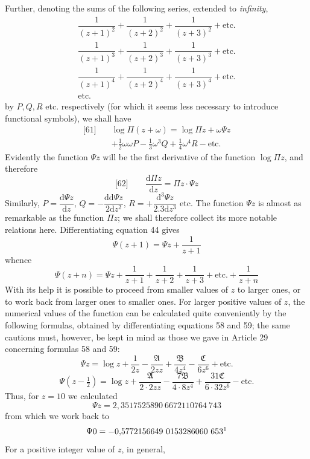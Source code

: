 Further, denoting the sums of the following series, extended to \textit{infinity},
\[
\begin{array}{l}
\dfrac{1}{(z+1)^2}+\dfrac{1}{(z+2)^2}+\dfrac{1}{(z+3)^2}+\text{etc.}\\[10pt]
\dfrac{1}{(z+1)^3}+\dfrac{1}{(z+2)^3}+\dfrac{1}{(z+3)^3}+\text{etc.}\\[10pt]
\dfrac{1}{(z+1)^4}+\dfrac{1}{(z+2)^4}+\dfrac{1}{(z+3)^4}+\text{etc.}\\[10pt]
\text{etc.}
\end{array}
\]
by $P,Q,R$ etc. respectively (for which it seems less necessary to introduce functional symbols), we shall have
\[
\begin{aligned}
{}\text{[61]}\quad&\log\Pi(z+\omega)=\log\Pi z+\omega\Psi z\\[4pt]
&+\tfrac12\omega\omega P-\tfrac13\omega^3Q+\tfrac14\omega^4R-\text{etc.}
\end{aligned}
\]
Evidently the function $\Psi z$ will be the first derivative of the function $\log\Pi z$, and therefore
\[
{}\text{[62]}\qquad \frac{\mathrm{d}\Pi z}{\mathrm{d}z}=\Pi z\cdot\Psi z
\]
Similarly, $P=\dfrac{\mathrm{d}\Psi z}{\mathrm{d}z}$, $Q=-\dfrac{\mathrm{dd}\Psi z}{2\mathrm{d}z^2}$, $R=+\dfrac{\mathrm{d}^3\Psi z}{2.3\mathrm{d}z^3}$ etc.
The function $\Psi z$ is almost as remarkable as the function $\Pi z$; we shall therefore collect its more notable relations here. Differentiating equation 44 gives
\[
\Psi(z+1)=\Psi z+\frac{1}{z+1}\tag*{[63]}
\]
whence
\[
\Psi(z+n)=\Psi z+\frac{1}{z+1}+\frac{1}{z+2}+\frac{1}{z+3}+\text{etc.}+\frac{1}{z+n}\tag*{[64]}
\]
With its help it is possible to proceed from smaller values of $z$ to larger ones, or to work back from larger ones to smaller ones. For larger positive values of $z$, the numerical values of the function can be calculated quite conveniently by the following formulas, obtained by differentiating equations 58 and 59; the same cautions must, however, be kept in mind as those we gave in Article 29 concerning formulas 58 and 59:
\[
\Psi z=\log z+\frac{1}{2z}-\frac{\mathfrak{A}}{2zz}+\frac{\mathfrak{B}}{4z^4}-\frac{\mathfrak{C}}{6z^6}+\text{etc.}\tag*{[65]}
\]
\[
\Psi\left(z-\tfrac12\right)=\log z+\frac{\mathfrak{A}}{2\cdot2zz}-\frac{7\mathfrak{B}}{4\cdot8z^4}+\frac{31\mathfrak{C}}{6\cdot32z^6}-\text{etc.}\tag*{[66]}
\]
Thus, for $z=10$ we calculated
\[
\Psi z=2{,}3517525890\ 6672110764\ 743
\]
from which we work back to
\[
\Psi0=-0{,}5772156649\ 0153286060\ 653\HistoricalNote{18}
\]
For a positive integer value of $z$, in general,

